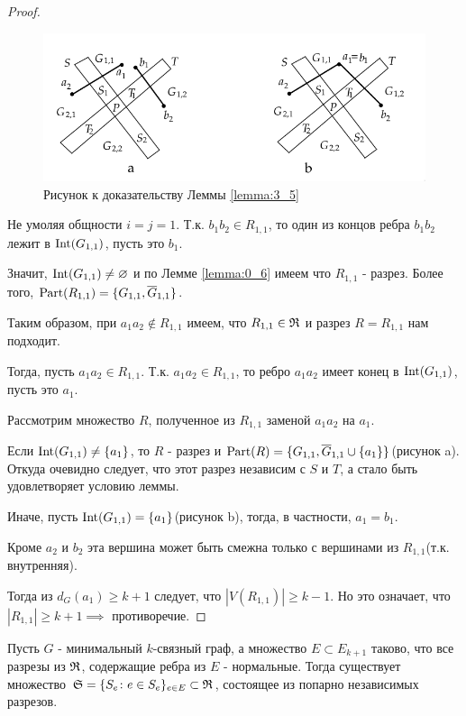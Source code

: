 \begin{proof}
	\begin{figure}[ht]
    \centering
	\includegraphics[width=0.5\columnwidth]{figures/3_lemma_5.png}
    \caption{Рисунок к доказательству Леммы \ref{lemma:3_5}}
	\label{fig:3_lemma_5}
	\end{figure}

Не умоляя общности $i = j = 1$. 
Т.к. $b_1b_2 \in R_{1,1}$, то один из концов ребра $b_1b_2$ лежит в $\operatorname{Int}(G_{1,1})$, пусть это  $b_1$.

Значит, $\operatorname{Int}(G_{1,1}) \neq \varnothing$ и по Лемме \ref{lemma:0_6} имеем что $R_{1,1}$ - разрез.
Более того, $\operatorname{Part}(R_{1,1}) = \{G_{1,1}, \overline G_{1,1}\}$.

Таким образом, при  $a_1a_2 \not \in R_{1,1}$ имеем, что $R_{1,1} \in \mathfrak{R}$ и разрез  $R = R_{1,1}$ нам подходит.

Тогда, пусть $a_1a_2 \in R_{1,1}$.
Т.к. $a_1a_2 \in R_{1,1}$, то ребро $a_1a_2$ имеет конец в $\operatorname{Int}(G_{1,1})$, пусть это  $a_1$.

Рассмотрим множество $R$, полученное из  $R_{1,1}$ заменой  $a_1a_2$ на $a_1$.

Если $\operatorname{Int}(G_{1,1}) \neq \{a_1 \}$, то $R$ - разрез и  $\operatorname{Part}(R) = \{G_{1,1}, \overline G_{1,1} \cup \{a_1\}\}$(рисунок a).
Откуда очевидно следует, что этот разрез независим с $S$ и  $T$, а стало быть удовлетворяет условию леммы.

Иначе, пусть  $\operatorname{Int}(G_{1,1}) = \{a_1\}$(рисунок b), тогда, в частности, $a_1 = b_1$.

Кроме $a_2$ и $b_2$ эта вершина может быть смежна только с вершинами из $R_{1,1}$(т.к. внутренняя).

Тогда из $d_{G}(a_1) \geqslant k + 1$  следует, что $|V(R_{1,1})| \geqslant k - 1$.
Но это означает, что  $|R_{1,1}| \geqslant k + 1 \implies$ противоречие.

\end{proof}

\begin{lm}[Лемма 3.6] \label{lemma:3_6}
	Пусть $G$ - минимальный  $k$-связный граф, а множество  $E \subset E_{k+1}$ таково, что все разрезы из  $\mathfrak{R}$, содержащие ребра из  $E$ - нормальные.
	Тогда существует множество  $\mathfrak{S} = \{S_e \colon e \in S_e \}_{e \in E} \subset \mathfrak{R}$, состоящее из попарно независимых разрезов.
\end{lm}

